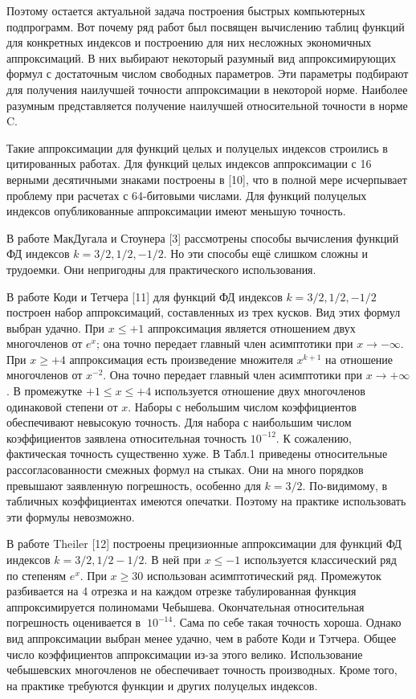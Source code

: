 Поэтому остается актуальной задача построения быстрых компьютерных подпрограмм. Вот почему
ряд работ был посвящен вычислению таблиц функций для конкретных
индексов и построению для них несложных экономичных аппроксимаций. В них выбирают некоторый
разумный вид аппроксимирующих формул с достаточным числом свободных
параметров. Эти параметры подбирают для получения наилучшей
точности аппроксимации в некоторой норме. Наиболее разумным
представляется получение наилучшей относительной точности в норме C.

Такие аппроксимации для функций целых и полуцелых индексов
строились в цитированных работах. Для функций целых индексов
аппроксимации с 16 верными десятичными знаками построены в [10], что в
полной мере исчерпывает проблему при расчетах с 64-битовыми
числами. Для функций полуцелых индексов опубликованные
аппроксимации имеют меньшую точность. 

В работе МакДугала и Стоунера [3] рассмотрены способы вычисления функций ФД индексов $k =3/2, 1/2, -1/2$. Но эти способы ещё слишком сложны и трудоемки. Они непригодны для практического использования.


В работе Коди и Тетчера [11] для функций ФД индексов $k =3/2, 1/2, -1/2$ построен набор аппроксимаций, составленных из трех кусков. Вид этих формул выбран удачно. При $x \leqslant +1$ аппроксимация является отношением двух многочленов от $e^x$; она точно передает главный член асимптотики при $x \to -\infty$. При $x \geqslant +4$ аппроксимация есть произведение множителя $x^{k+1}$ на отношение многочленов от $x^{-2}$. Она точно передает главный член асимптотики при $x \to +\infty$. В промежутке $+1 \leqslant x \leqslant +4$ используется отношение двух многочленов одинаковой степени от $x$. Наборы с небольшим числом коэффициентов обеспечивают невысокую точность. Для набора с наибольшим числом коэффициентов заявлена относительная точность $10^{-12}$. К сожалению, фактическая точность существенно хуже. В Табл.1 приведены относительные рассогласованности смежных формул на стыках. Они на много порядков превышают заявленную погрешность, особенно для $k = 3/2$. По-видимому, в табличных коэффициентах имеются опечатки. Поэтому на практике использовать эти формулы невозможно. 

В работе Theiler [12] построены прецизионные аппроксимации для функций ФД индексов $k = 3/2, 1/2 -1/2$. В ней при $x \leqslant -1$ используется классический ряд по степеням $e^x$. При $x \geqslant 30$ использован асимптотический ряд. Промежуток разбивается на 4 отрезка и на каждом отрезке табулированная функция аппроксимируется полиномами Чебышева. Окончательная относительная погрешность оценивается в $~10^{-14}$. Сама по себе такая точность хороша. Однако вид аппроксимации выбран менее удачно, чем в работе Коди и Тэтчера. Общее число коэффициентов аппроксимации из-за этого велико. Использование чебышевских многочленов не обеспечивает точность производных. Кроме того, на практике требуются функции и других полуцелых индексов.

